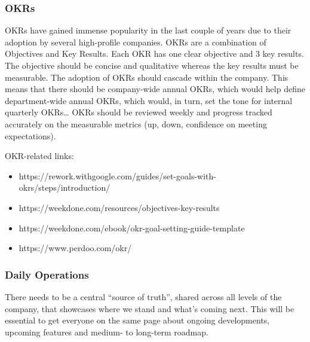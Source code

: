 \documentclass[11pt,a4paper,parskip=half]{scrartcl}
\begin{document}
\subsubsection{OKRs}
OKRs have gained immense popularity in the last couple of years due to their adoption by several high-profile companies. 
OKRs are a combination of Objectives and Key Results. Each OKR has one clear objective and 3 key results. The objective should be concise and qualitative whereas the key results must be measurable.
The adoption of OKRs should cascade within the company. This means that there should be company-wide annual OKRs, which would help define department-wide annual OKRs, which would, in turn, set the tone for internal quarterly OKRs… 
OKRs should be reviewed weekly and progress tracked accurately on the measurable metrics (up, down, confidence on meeting expectations).

OKR-related links:
\begin{itemize}
    \item https://rework.withgoogle.com/guides/set-goals-with-okrs/steps/introduction/
    \item https://weekdone.com/resources/objectives-key-results
    \item https://weekdone.com/ebook/okr-goal-setting-guide-template
    \item https://www.perdoo.com/okr/
\end{itemize}

\subsubsection{Daily Operations}
There needs to be a central “source of truth”, shared across all levels of the company, that showcases where we stand and what’s coming next. This will be essential to get everyone on the same page about ongoing developments, upcoming features and medium- to long-term roadmap. 
\end{document}
